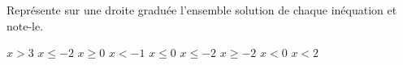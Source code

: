 %
%
    Représente sur une droite graduée l'ensemble solution de chaque inéquation et note-le.
    \begin{tasks}
        \task $x > 3$
        \task $x \le -2$
        \task $x \ge 0$
        \task $x < -1$
        \task $x \le 0$
        \task $x \le -2$
        \task $x \ge -2$
        \task $x < 0$
        \task $x < 2$
    \end{tasks}
